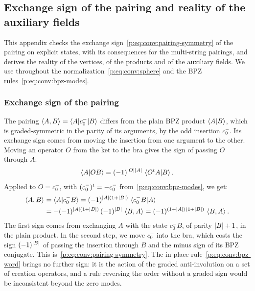 \subsection{Exchange sign of the pairing and reality of the auxiliary fields}
\label{p:app:reality}


This appendix checks the exchange sign~\eqref{p:eq:conv:pairing-symmetry} of the pairing on explicit states, with its consequences for the multi-string pairings, and derives the reality of the vertices, of the products and of the auxiliary fields.
We use throughout the normalization~\eqref{p:eq:conv:sphere} and the BPZ rules~\eqref{p:eq:conv:bpz-modes}.


\subsubsection{Exchange sign of the pairing}

The pairing $\braket{A, B}_{} = \braket{A | c_0^- | B}$ differs from the plain BPZ product $\braket{A | B}$, which is graded-symmetric in the parity of its arguments, by the odd insertion $c_0^-$.
Its exchange sign comes from moving the insertion from one argument to the other.
Moving an operator $O$ from the ket to the bra gives the sign of passing $O$ through $A$:
\begin{equation}
\braket{A | O B}
  = (-1)^{{|O|} {|A|}} \, \braket{{O^t} A | B}.
\end{equation}
Applied to $O = c_0^-$, with ${(c_0^-)^t} = - c_0^-$ from~\eqref{p:eq:conv:bpz-modes}, we get:
\begin{equation}
  \label{p:eq:rea:exchange-general}
  \begin{aligned}
    \braket{A, B}_{}
      &
      = \braket{A | c_0^- B}
      = (-1)^{{|A|} (1 + {|B|})} \, \braket{c_0^- B | A}
    \\
      &
      = - (-1)^{{|A|} (1 + {|B|})} \, (-1)^{{|B|}} \, \braket{B, A}_{}
      = (-1)^{(1 + {|A|}) (1 + {|B|})} \, \braket{B, A}_{}.
  \end{aligned}
\end{equation}
The first sign comes from exchanging $A$ with the state $c_0^- B$, of parity ${|B|} + 1$, in the plain product.
In the second step, we move $c_0^-$ into the bra, which costs the sign $(-1)^{{|B|}}$ of passing the insertion through $B$ and the minus sign of its BPZ conjugate.
This is~\eqref{p:eq:conv:pairing-symmetry}.
The in-place rule~\eqref{p:eq:conv:bpz-word} brings no further sign: it is the action of the graded anti-involution on a set of creation operators, and a rule reversing the order without a graded sign would be inconsistent beyond the zero modes.


